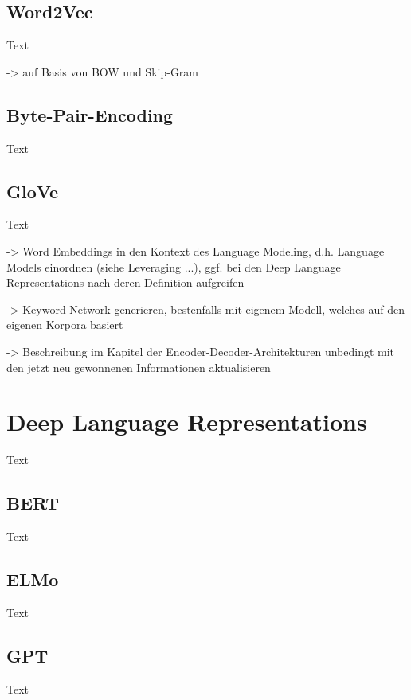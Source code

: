 \subsection{Word2Vec}
\noindent
Text

-> auf Basis von BOW und Skip-Gram

\subsection{Byte-Pair-Encoding}
\noindent
Text

\subsection{GloVe}
\noindent
Text


-> Word Embeddings in den Kontext des Language Modeling, d.h. Language Models einordnen (siehe Leveraging ...), ggf. bei den Deep Language Representations nach deren Definition aufgreifen

-> Keyword Network generieren, bestenfalls mit eigenem Modell, welches auf den eigenen Korpora basiert

-> Beschreibung im Kapitel der Encoder-Decoder-Architekturen unbedingt mit den jetzt neu gewonnenen Informationen aktualisieren


\section{Deep Language Representations}
Text

\subsection{BERT}
\noindent
Text

\subsection{ELMo}
\noindent
Text

\subsection{GPT}
\noindent
Text


